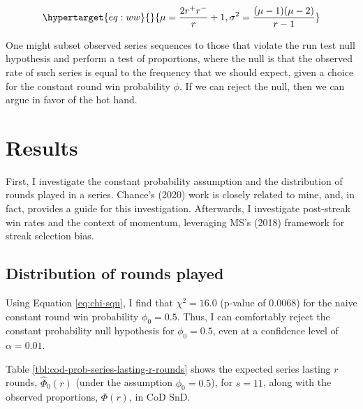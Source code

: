 \documentclass{article}
\begin{document}
\begin{equation}\protect\hypertarget{eq:ww}{}{
\mu = \frac{2r^{+}r^{-}}{r} + 1, \sigma^2 = \frac{(\mu-1)(\mu-2)}{r-1}
}\label{eq:ww}\end{equation}

One might subset observed series sequences to those that violate the run
test null hypothesis and perform a test of proportions, where the null
is that the observed rate of such series is equal to the frequency that
we should expect, given a choice for the constant round win probability
\(\phi\). If we can reject the null, then we can argue in favor of the
hot hand.

\hypertarget{results}{%
\section{Results}\label{results}}

First, I investigate the constant probability assumption and the
distribution of rounds played in a series. Chance's (2020) work is
closely related to mine, and, in fact, provides a guide for this
investigation. Afterwards, I investigate post-streak win rates and the
context of momentum, leveraging MS's (2018) framework for streak
selection bias.

\hypertarget{distribution-of-rounds-played-1}{%
\subsection{Distribution of rounds
played}\label{distribution-of-rounds-played-1}}

Using Equation \ref{eq:chi-squ}, I find that \(\chi^2 = 16.0\) (p-value
of 0.0068) for the naive constant round win probability
\(\phi_0 = 0.5\). Thus, I can comfortably reject the constant
probability null hypothesis for \(\phi_0 = 0.5\), even at a confidence
level of \(\alpha = 0.01\).

Table \ref{tbl:cod-prob-series-lasting-r-rounds} shows the expected
series lasting \(r\) rounds, \(\hat{\Phi}_0(r)\) (under the assumption
\(\phi_0 = 0.5\)), for \(s = 11\), along with the observed proportions,
\(\Phi(r)\), in CoD SnD.
\end{document}
